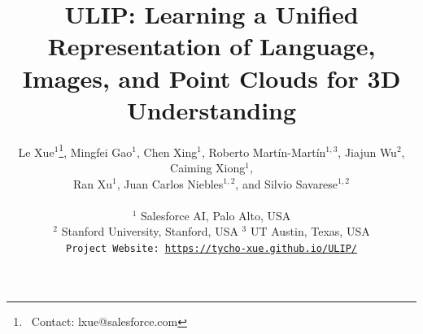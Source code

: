 \documentclass[10pt,twocolumn,letterpaper]{article}
\begin{document}
\title{ULIP: Learning a Unified Representation of Language, Images, and Point Clouds for 3D Understanding}
\author{Le Xue$^{1}$\thanks{\ Contact: lxue@salesforce.com},
Mingfei Gao$^{1}$,
Chen Xing$^{1}$,
Roberto Martín-Martín$^{1, 3}$,
Jiajun Wu$^{2}$,
Caiming Xiong$^{1}$,
\\
Ran Xu$^{1}$,
Juan Carlos Niebles$^{1, 2}$, and
Silvio Savarese$^{1, 2}$
\\
\\
$^{1}$ Salesforce AI, Palo Alto, USA \\
$^{2}$ Stanford University, Stanford, USA \quad ${^3}$ UT Austin, Texas, USA \\
{\tt\small Project Website: \href{https://tycho-xue.github.io/ULIP/}{https://tycho-xue.github.io/ULIP/}}}

\maketitle
\end{document}
